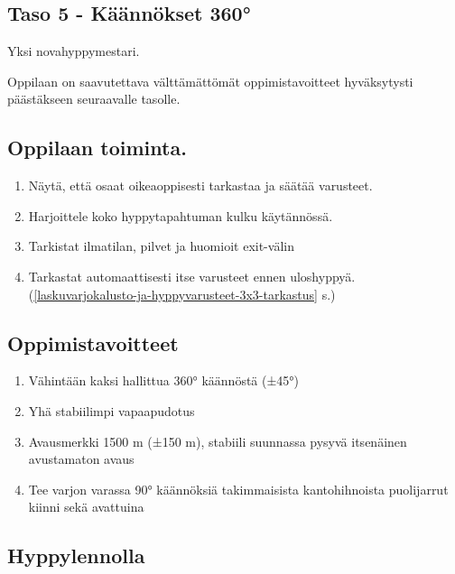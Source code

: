\begin{multicols}{2}
\end{multicols}\pagebreak\begin{multicols}{2} 

\section{ Taso 5 - Käännökset 360° }
\label{nova-alkeiskoulutuksen-suoritukset-taso-5-kaannokset-360deg}


Yksi novahyppymestari. 


Oppilaan on saavutettava välttämättömät oppimistavoitteet hyväksytysti päästäkseen seuraavalle tasolle. 

\subsection{ Oppilaan toiminta. }
\label{nova-alkeiskoulutuksen-suoritukset-oppilaan-toiminta}

\begin{enumerate}[label=\bfseries \arabic*)]
\item  Näytä, että osaat oikeaoppisesti tarkastaa ja säätää varusteet. 
\item  Harjoittele koko hyppytapahtuman kulku käytännössä. 
\item  Tarkistat ilmatilan, pilvet ja huomioit exit-välin  
\item  Tarkastat automaattisesti itse varusteet ennen uloshyppyä. (\ref{laskuvarjokalusto-ja-hyppyvarusteet-3x3-tarkastus} s.\pageref{laskuvarjokalusto-ja-hyppyvarusteet-3x3-tarkastus}) 
\end{enumerate}
\subsection{ Oppimistavoitteet }
\label{nova-alkeiskoulutuksen-suoritukset-oppimistavoitteet}

\begin{enumerate}[label=\bfseries \arabic*)]
\item  Vähintään kaksi hallittua 360° käännöstä (±45°) 
\item  Yhä stabiilimpi vapaapudotus  
\item  Avausmerkki 1500 m (±150 m), stabiili suunnassa pysyvä itsenäinen avustamaton avaus   
\item  Tee varjon varassa 90° käännöksiä takimmaisista kantohihnoista puolijarrut kiinni sekä avattuina 
\end{enumerate}
\subsection{ Hyppylennolla }
\label{nova-alkeiskoulutuksen-suoritukset-hyppylennolla}


\end{multicols}
